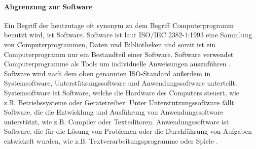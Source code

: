 \paragraph{Abgrenzung zur Software}
Ein Begriff der heutzutage oft synonym zu dem Begriff Computerprogramm benutzt wird,
ist Software. Software ist laut ISO/IEC 2382-1:1993 eine Sammlung von Computerprogrammen, 
Daten und Bibliotheken und somit ist ein Computerprogramm nur ein Bestandteil einer Software.
Software verwendet Computerprogramme als Tools um individuelle Anweisungen auszuführen 
\cite{ComputerProgrammeUnverzichtbareComputerprogramme}.
Software wird nach dem oben genannten ISO-Standard außerdem in 
Systemsoftware, Unterstützungssoftware und Anwendungssoftware unterteilt.
Systemsoftware ist Software, welche die Hardware des Computers steuert, 
wie z.B. Betriebssysteme oder Gerätetreiber. Unter Unterstützungssoftware 
fällt Software, die die Entwicklung und Ausführung von Anwendungssoftware
unterstützt, wie z.B. Compiler oder Texteditoren. Anwendungssoftware ist
Software, die für die Lösung von Problemen oder die Durchführung von Aufgaben
entwickelt wurden, wie z.B. Textverarbeitungsprogramme oder Spiele
\cite{instituteofelectricalandelectronicsengineersinc.ISO47652010}.
\\
